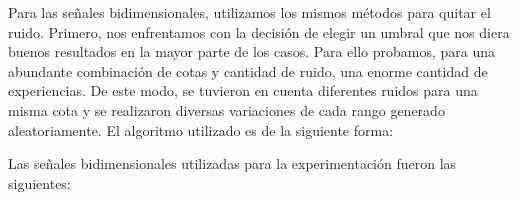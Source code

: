 \documentclass[10pt, a4paper]{article}
\begin{document}
\begin{itemize}
Para las señales bidimensionales, utilizamos los mismos métodos para quitar el ruido. Primero, nos enfrentamos con la decisión de elegir un umbral que nos diera buenos resultados en la mayor parte de los casos. Para ello probamos, para una abundante combinación de cotas y cantidad de ruido, una enorme cantidad de experiencias. De este modo, se tuvieron en cuenta diferentes ruidos para una misma cota y se realizaron diversas variaciones de cada rango generado aleatoriamente.\newline
El algoritmo utilizado es de la siguiente forma:

\begin{algorithm}[H]
\begin{algorithmic}[1]
   	
   \EndFor
   
   \EndFor
\end{algorithmic}
\end{algorithm}

Las señales bidimensionales utilizadas para la experimentación fueron las siguientes:


\end{itemize}
\end{document}
